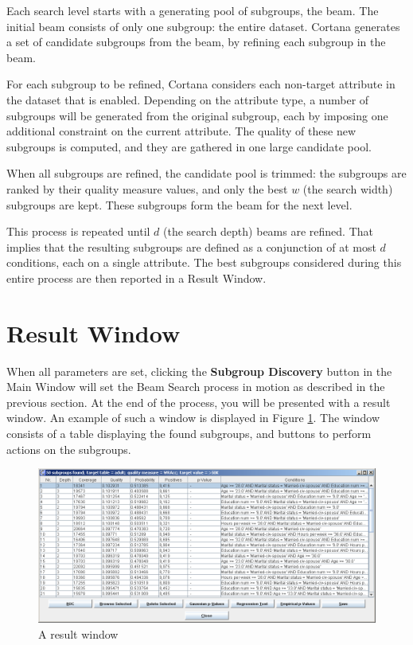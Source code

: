 \documentclass{article}
\begin{document}
Each search level starts with a generating pool of subgroups, the
\gls{beam}.  The initial beam consists of only one subgroup: the entire
dataset.  Cortana generates a set of candidate subgroups from the beam, by
refining each subgroup in the beam.

For each subgroup to be refined, Cortana considers each non-target attribute
in the dataset that is \gls{enabled}.  Depending on the attribute type, a
number of subgroups will be generated from the original subgroup, each by
imposing one additional constraint on the current attribute.  The quality of
these new subgroups is computed, and they are gathered in one large
candidate pool.

When all subgroups are refined, the candidate pool is trimmed: the subgroups
are ranked by their quality measure values, and only the best $w$ (the
\gls{search width}) subgroups are kept. These subgroups form the \gls{beam}
for the next level.

This process is repeated until $d$ (the \gls{search depth}) beams are
refined.  That implies that the resulting subgroups are defined as a
conjunction of at most $d$ conditions, each on a single attribute.  The best
subgroups considered during this entire process are then reported in a
Result Window.

\section{Result Window}
\label{section:result-window}

When all parameters are set, clicking the \textbf{Subgroup Discovery} button
in the Main Window will set the Beam Search process in motion as described
in the previous section. At the end of the process, you will be presented
with a result window. An example of such a window is displayed in Figure
\ref{fig:resultwindow}. The window consists of a table displaying the found
subgroups, and buttons to perform actions on the subgroups.

\begin{figure}[t]
\begin{center}
\includegraphics[width=\textwidth]{resultwindow_r1011.png}
\caption{A result window}
\label{fig:resultwindow}
\end{center}
\end{figure}
\end{document}
